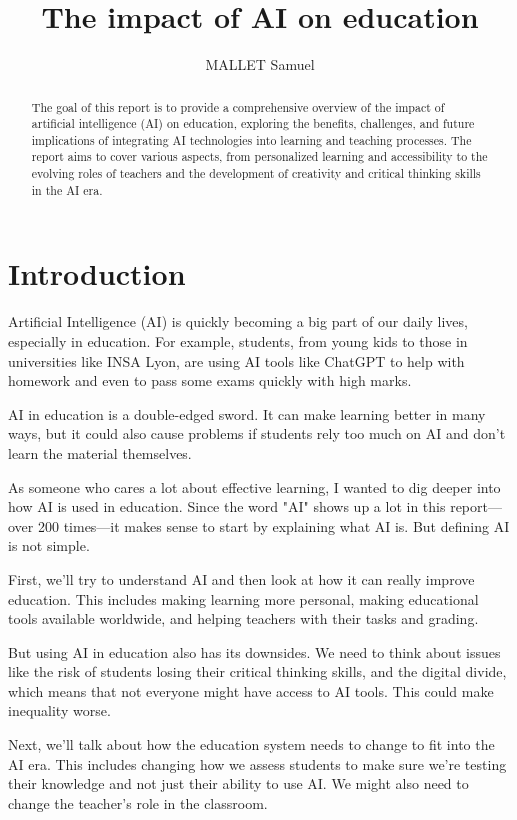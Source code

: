 \documentclass{article}
\title{The impact of AI on education}
\author{MALLET Samuel}
\begin{document}
\maketitle

\begin{abstract}
    The goal of this report is to provide a comprehensive
    overview of the impact of artificial intelligence (AI)
    on education, exploring the benefits, challenges, and
    future implications of integrating AI technologies into
    learning and teaching processes. The report aims to cover
    various aspects, from personalized learning and
    accessibility to the evolving roles of teachers and the
    development of creativity and critical thinking skills
    in the AI era.
\end{abstract}

\newpage

\tableofcontents

\newpage
\section{Introduction}
Artificial Intelligence (AI) is quickly becoming a big part of our daily lives, especially in education. For example, students, from young kids to those in universities like INSA Lyon, are using AI tools like ChatGPT to help with homework and even to pass some exams quickly with high marks.

AI in education is a double-edged sword. It can make learning better in many ways, but it could also cause problems if students rely too much on AI and don't learn the material themselves.

As someone who cares a lot about effective learning, I wanted to dig deeper into how AI is used in education. Since the word "AI" shows up a lot in this report—over 200 times—it makes sense to start by explaining what AI is. But defining AI is not simple.

First, we'll try to understand AI and then look at how it can really improve education. This includes making learning more personal, making educational tools available worldwide, and helping teachers with their tasks and grading.

But using AI in education also has its downsides. We need to think about issues like the risk of students losing their critical thinking skills, and the digital divide, which means that not everyone might have access to AI tools. This could make inequality worse.

Next, we'll talk about how the education system needs to change to fit into the AI era. This includes changing how we assess students to make sure we're testing their knowledge and not just their ability to use AI. We might also need to change the teacher's role in the classroom.
\end{document}
